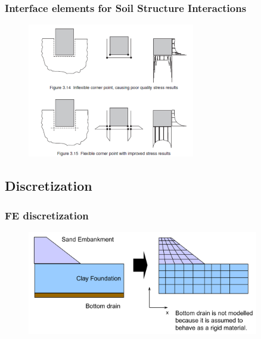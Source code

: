 \documentclass[handout]{beamer}
\begin{document}
\begin{frame}
\frametitle{Interface elements for Soil Structure Interactions}
\begin{figure}[ht]
	\centering
	\includegraphics[width=0.65\textwidth]{figs/interface-ssi.png}
\end{figure}
\end{frame}

\subsection{Discretization}
\begin{frame}
\frametitle{FE discretization}
\begin{figure}[ht]
	\centering
	\includegraphics[width=0.9\textwidth]{figs/discretization.png}
\end{figure}
\end{frame}
\end{document}
